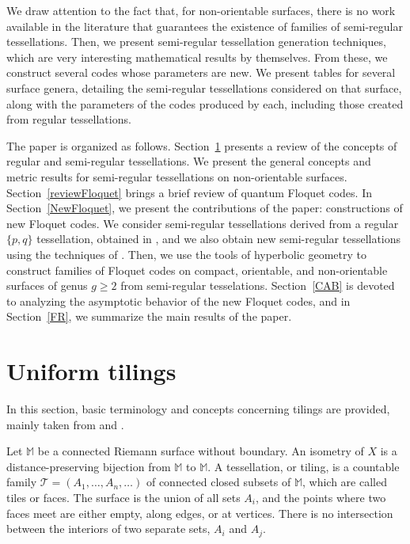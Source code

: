 \documentclass[%
reprint,
amsmath,amssymb,
aps,
]{revtex4-2}
\newcommand{\tes}{\mathcal{T}}
\newcommand{\M}{\mathbb{M}}
\begin{document}
We draw attention to the fact that, for non-orientable surfaces, there is no work available in the literature that guarantees the existence of families of semi-regular tessellations. Then, we present semi-regular tessellation generation techniques, which are very interesting mathematical results by themselves. From these, we construct several codes whose parameters are new. We present tables for several surface genera, detailing the semi-regular tessellations considered on that surface, along with the parameters of the codes produced by each, including those created from regular tessellations.

The paper is organized as follows. Section~\ref{sec:semireg} presents a review of the concepts of regular and semi-regular tessellations. We present the general concepts and metric results for semi-regular tessellations on non-orientable surfaces. Section~\ref{reviewFloquet} brings a brief review of quantum Floquet codes. In Section~\ref{NewFloquet}, we present the contributions of the paper: constructions of new Floquet codes. We consider semi-regular tessellations derived from a regular $\{p, q\}$ tessellation, obtained in \cite{Douglas1}, and we also obtain new semi-regular tessellations using the techniques of \cite{antonio}. Then, we use the tools of hyperbolic geometry to construct families of Floquet codes on compact, orientable, and non-orientable surfaces of genus $g\geq 2$ from semi-regular tesselations. Section~\ref{CAB} is devoted to analyzing the asymptotic behavior of the new Floquet codes, and in Section~\ref{FR}, we summarize the main results of the paper. 

\section{Uniform tilings} \label{sec:semireg}

In this section, basic terminology and concepts concerning tilings are provided, mainly taken from \cite{artigo-giovana} and \cite{Douglas1}.

Let $\M$ be a connected Riemann surface without boundary. An isometry of $X$ is a distance-preserving bijection from $\M$ to $\M$. A tessellation, or tiling, is a countable family $\tes = (A_1, \hdots, A_n, \hdots)$ of connected closed subsets of $\M$, which are called tiles or faces. The surface is the union of all sets $A_i$, and the points where two faces meet are either empty, along edges, or at vertices. There is no intersection between the interiors of two separate sets, $A_i$ and $A_j$. 
\end{document}
